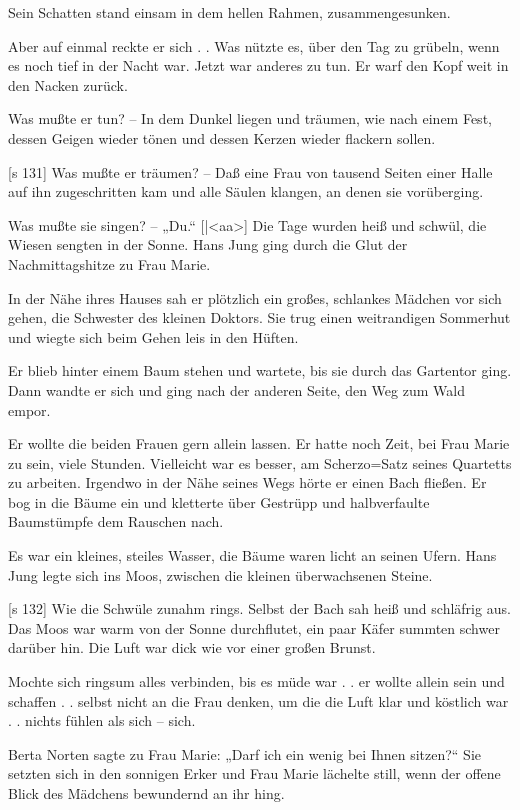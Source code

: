 Sein Schatten stand einsam in dem hellen Rahmen,
zusammengesunken.

Aber auf einmal reckte er sich . . Was nützte
es, über den Tag zu grübeln, wenn es noch tief in
der Nacht war. Jetzt war anderes zu tun. Er warf
den Kopf weit in den Nacken zurück.

Was mußte er tun? – In dem Dunkel liegen
und träumen, wie nach einem Fest, dessen Geigen
wieder tönen und dessen Kerzen wieder flackern sollen.

[s 131]
Was mußte er träumen? – Daß eine Frau von
tausend Seiten einer Halle auf ihn zugeschritten kam
und alle Säulen klangen, an denen sie vorüberging.

Was mußte sie singen? – „Du.“
[|<aa>]
Die Tage wurden heiß und schwül, die Wiesen
sengten in der Sonne. Hans Jung ging durch die
Glut der Nachmittagshitze zu Frau Marie.

In der Nähe ihres Hauses sah er plötzlich ein
großes, schlankes Mädchen vor sich gehen, die Schwester
des kleinen Doktors. Sie trug einen weitrandigen
Sommerhut und wiegte sich beim Gehen leis in
den Hüften.

Er blieb hinter einem Baum stehen und wartete,
bis sie durch das Gartentor ging. Dann wandte er
sich und ging nach der anderen Seite, den Weg zum
Wald empor.

Er wollte die beiden Frauen gern allein lassen.
Er hatte noch Zeit, bei Frau Marie zu sein, viele
Stunden. Vielleicht war es besser, am Scherzo=Satz
seines Quartetts zu arbeiten. Irgendwo in der Nähe
seines Wegs hörte er einen Bach fließen. Er bog
in die Bäume ein und kletterte über Gestrüpp und
halbverfaulte Baumstümpfe dem Rauschen nach.

Es war ein kleines, steiles Wasser, die Bäume
waren licht an seinen Ufern. Hans Jung legte sich
ins Moos, zwischen die kleinen überwachsenen Steine.

[s 132]
Wie die Schwüle zunahm rings. Selbst der
Bach sah heiß und schläfrig aus. Das Moos war
warm von der Sonne durchflutet, ein paar Käfer
summten schwer darüber hin. Die Luft war dick
wie vor einer großen Brunst.

Mochte sich ringsum alles verbinden, bis es müde
war . . er wollte allein sein und schaffen . . selbst
nicht an die Frau denken, um die die Luft klar und
köstlich war . . nichts fühlen als sich – sich.

Berta Norten sagte zu Frau Marie: „Darf ich
ein wenig bei Ihnen sitzen?“ Sie setzten sich in
den sonnigen Erker und Frau Marie lächelte still,
wenn der offene Blick des Mädchens bewundernd
an ihr hing.

